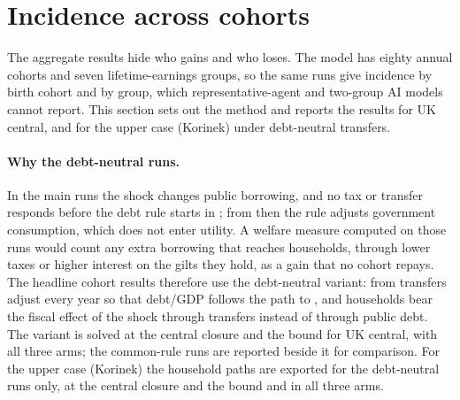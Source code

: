 \section{Incidence across cohorts}
\label{sec:incidence}

The aggregate results hide who gains and who loses. The model has eighty annual cohorts and seven lifetime-earnings groups, so the same runs give incidence by birth cohort and by group, which representative-agent and two-group AI models cannot report. This section sets out the method and reports the results for UK central, and for the upper case (Korinek) under debt-neutral transfers.

\paragraph{Why the debt-neutral runs.} In the main runs the shock changes public borrowing, and no tax or transfer responds before the debt rule starts in \genDebtRuleYear{}; from then the rule adjusts government consumption, which does not enter utility. A welfare measure computed on those runs would count any extra borrowing that reaches households, through lower taxes or higher interest on the gilts they hold, as a gain that no cohort repays. The headline cohort results therefore use the debt-neutral variant: from \genShockYear{} transfers adjust every year so that debt/GDP follows the path to \genDebtRuleYear{}, and households bear the fiscal effect of the shock through transfers instead of through public debt. The variant is solved at the central closure and the bound for UK central, with all three arms; the common-rule runs are reported beside it for comparison. For the upper case (Korinek) the household paths are exported for the debt-neutral runs only, at the central closure and the bound and in all three arms.

